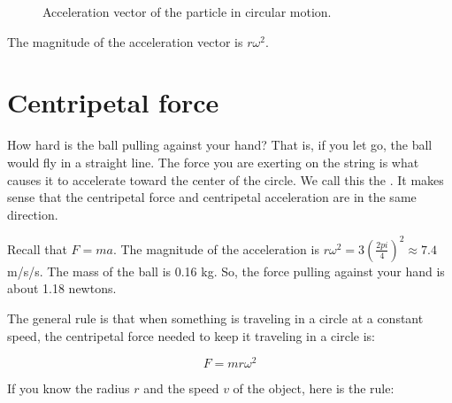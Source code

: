 \begin{figure}[htbp]
    \begin{center}
        
    \end{center}
    \caption{Acceleration vector of the particle in circular motion.}
    \label{fig:billardBallAcceleration}
\end{figure}

The magnitude of the acceleration vector is $r \omega^2$.

\section{Centripetal force}

How hard is the ball pulling against your hand? That is, if you let go, the ball would fly in a straight line.  
The force you are exerting on the string is what causes it to accelerate toward the center of the
circle. We call this the . It makes sense that the centripetal force and centripetal acceleration are in the same direction. 

Recall that $F = m a$.  The magnitude of the acceleration is $r
\omega^2 = 3 \left(\frac{2 pi}{4}\right)^2 \approx 7.4$ m/s/s.  The mass
of the ball is 0.16 kg.  So, the force pulling against your hand is
about 1.18 newtons.

The general rule is that when something is traveling in a circle at a
constant speed, the centripetal force needed to keep it traveling in a
circle is:

$$F = m r \omega^2$$

If you know the radius $r$ and the speed $v$ of the object, here is the rule:

